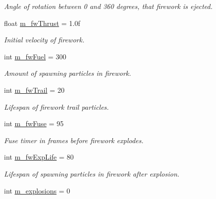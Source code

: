 \begin{DoxyCompactItemize}
\begin{DoxyCompactList}\small\item\em Angle of rotation between 0 and 360 degrees, that firework is ejected. \end{DoxyCompactList}\item 
\hypertarget{classEmitter_ac1325204ad2906d835790453b810763b}{float \hyperlink{classEmitter_ac1325204ad2906d835790453b810763b}{m\-\_\-fw\-Thrust} = 1.\-0f}\label{classEmitter_ac1325204ad2906d835790453b810763b}

\begin{DoxyCompactList}\small\item\em Initial velocity of firework. \end{DoxyCompactList}\item 
\hypertarget{classEmitter_adcdc6f5ca0e589fbf20ec45140c5a4aa}{int \hyperlink{classEmitter_adcdc6f5ca0e589fbf20ec45140c5a4aa}{m\-\_\-fw\-Fuel} = 300}\label{classEmitter_adcdc6f5ca0e589fbf20ec45140c5a4aa}

\begin{DoxyCompactList}\small\item\em Amount of spawning particles in firework. \end{DoxyCompactList}\item 
\hypertarget{classEmitter_a2ddd6ee2e0e1609024903644f61543fc}{int \hyperlink{classEmitter_a2ddd6ee2e0e1609024903644f61543fc}{m\-\_\-fw\-Trail} = 20}\label{classEmitter_a2ddd6ee2e0e1609024903644f61543fc}

\begin{DoxyCompactList}\small\item\em Lifespan of firework trail particles. \end{DoxyCompactList}\item 
\hypertarget{classEmitter_ab17edfb3652261eb28b1d03f91f9d044}{int \hyperlink{classEmitter_ab17edfb3652261eb28b1d03f91f9d044}{m\-\_\-fw\-Fuse} = 95}\label{classEmitter_ab17edfb3652261eb28b1d03f91f9d044}

\begin{DoxyCompactList}\small\item\em Fuse timer in frames before firework explodes. \end{DoxyCompactList}\item 
\hypertarget{classEmitter_a4b411dc3c9945ce1b987e67dfe73034d}{int \hyperlink{classEmitter_a4b411dc3c9945ce1b987e67dfe73034d}{m\-\_\-fw\-Exp\-Life} = 80}\label{classEmitter_a4b411dc3c9945ce1b987e67dfe73034d}

\begin{DoxyCompactList}\small\item\em Lifespan of spawning particles in firework after explosion. \end{DoxyCompactList}\item 
\hypertarget{classEmitter_ad4f37d42386349dd35897d1f90bc9626}{int \hyperlink{classEmitter_ad4f37d42386349dd35897d1f90bc9626}{m\-\_\-explosions} = 0}\label{classEmitter_ad4f37d42386349dd35897d1f90bc9626}


\end{DoxyCompactItemize}
